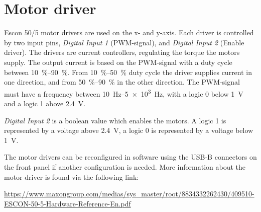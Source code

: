 \section{Motor driver}
Escon 50/5 motor drivers are used on the x- and y-axis. Each driver is controlled by two input pins, \textit{Digital Input 1} (PWM-signal), and \textit{Digital Input 2} (Enable driver). The drivers are current controllers, regulating the torque the motors supply. The output current is based on the PWM-signal with a duty cycle between \SIrange{10}{90}{\percent}. From \SIrange{10}{50}{\percent} duty cycle the driver supplies current in one direction, and from \SIrange{50}{90}{\percent} in the other direction. The PWM-signal must have a frequency between \SIrange{10}{5e3}{\hertz}, with a logic 0 below \SI{1}{\volt} and a logic 1 above \SI{2.4}{\volt}.

\textit{Digital Input 2} is a boolean value which enables the motors. A logic 1 is represented by a voltage above \SI{2.4}{\volt}, a logic 0 is represented by a voltage below \SI{1}{\volt}.



The motor drivers can be reconfigured in software using the USB-B connectors on the front panel if another configuration is needed. More information about the motor driver is found via the following link:

\url{https://www.maxongroup.com/medias/sys_master/root/8834332262430/409510-ESCON-50-5-Hardware-Reference-En.pdf}